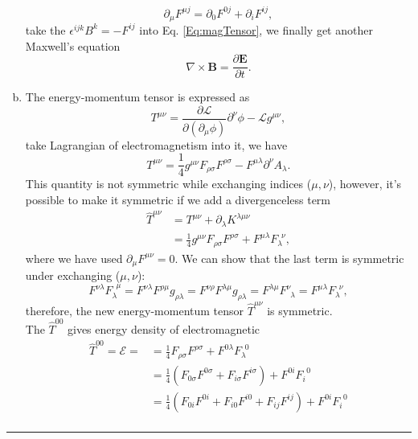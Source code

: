 \documentclass[12pt]{report}
\numberwithin{problemname}{chapter}
\newenvironment{solution}{\vspace{1em}\par\noindent{\large\textbf{\textsc{Solution}}}\par}{\vspace{1em}\hrule}
\begin{document}
\begin{solution}
\begin{enumerate}[(a)]
\begin{equation}
        \partial_{\mu}F^{\mu j}=\partial_{0}F^{0j}+\partial_{i}F^{ij},\label{Eq:magTensor}
    \end{equation}
    take the $\epsilon^{ijk}B^{k}=-F^{ij}$ into Eq. \eqref{Eq:magTensor}, we finally get another Maxwell's equation
    \begin{equation}
        \nabla\times\mathbf{B}=\frac{\partial\mathbf{E}}{\partial t}.
    \end{equation}
    \item The energy-momentum tensor is expressed as 
    \begin{equation}
        T^{\mu\nu}=\frac{\partial\mathcal{L}}{\partial(\partial_{\mu}\phi)}\partial^{\nu}\phi-\mathcal{L}g^{\mu\nu},
    \end{equation}
    take Lagrangian of electromagnetism into it, we have
    \begin{equation}
        T^{\mu\nu}=\frac{1}{4}g^{\mu\nu}F_{\rho\sigma}F^{\rho\sigma}-F^{\mu\lambda}\partial^{\nu}A_{\lambda}.
    \end{equation}
    This quantity is not symmetric while exchanging indices ($\mu, \nu$), however, it's possible to make it symmetric if we add a divergenceless term
    \begin{align}
        \hat{T}^{\mu\nu}&=T^{\mu\nu}+\partial_{\lambda}K^{\lambda\mu\nu} \nonumber \\
        &=\frac{1}{4}g^{\mu\nu}F_{\rho\sigma}F^{\rho\sigma}+F^{\mu\lambda}F_{\lambda}^{\enspace\nu},
    \end{align}
    where we have used $\partial_{\mu}F^{\mu\nu}=0$. We can show that the last term is symmetric under exchanging ($\mu, \nu$):
    \begin{equation}
        F^{\nu\lambda}F_{\lambda}^{\enspace\mu}=F^{\nu\lambda}F^{\rho\mu}g_{\rho\lambda}=F^{\nu\rho}F^{\lambda\mu}g_{\rho\lambda}=F^{\lambda\mu}F_{\enspace\lambda}^{\nu}=F^{\mu\lambda}F_{\lambda}^{\enspace\nu},
    \end{equation}
    therefore, the new energy-momentum tensor $\hat{T}^{\mu\nu}$ is symmetric. \\
    The $\hat{T}^{00}$ gives energy density of electromagnetic
    \begin{align}
        \hat{T}^{00}=\mathcal{E}=&=\frac{1}{4}F_{\rho\sigma}F^{\rho\sigma}+F^{0\lambda}F_{\lambda}^{\enspace 0} \nonumber \\
        &=\frac{1}{4}(F_{0\sigma}F^{0\sigma}+F_{i\sigma}F^{i\sigma})+F^{0i}F_{i}^{\enspace 0} \nonumber \\
        &=\frac{1}{4}(F_{0i}F^{0i}+F_{i0}F^{i0}+F_{ij}F^{ij})+F^{0i}F_{i}^{\enspace 0} \nonumber \\

\end{align}
\end{enumerate}
\end{solution}
\end{document}
